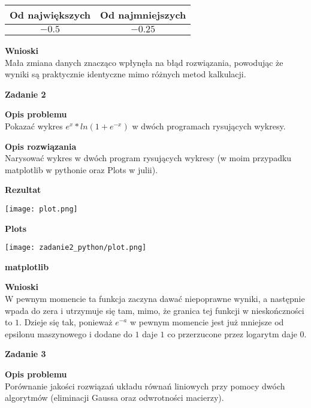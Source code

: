 \documentclass{article}
\begin{document}
\begin{center}
	\begin{tabular}{|c|c|}
		\hline
		\textbf{Od największych} & \textbf{Od najmniejszych} \\
		\hline
		$-0.5$                   & $-0.25$                   \\
		\hline
	\end{tabular}
\end{center}

\noindent \textbf{Wnioski} \\
Mała zmiana danych znacząco wpłynęła na błąd rozwiązania, powodując że wyniki
są praktycznie identyczne mimo różnych metod kalkulacji.

\noindent \textbf{\large Zadanie 2}

\noindent \textbf{Opis problemu} \\
Pokazać wykres $e^x*ln(1 + e^{-x})$ w dwóch programach rysujących wykresy.

\noindent \textbf{Opis rozwiązania} \\
Narysować wykres w dwóch program rysujących wykresy (w moim przypadku
matplotlib w pythonie oraz Plots w julii).

\pagebreak

\noindent \textbf{Rezultat}

\begin{center}
	\texttt{[image: plot.png]}

	\textbf{Plots}
\end{center}

\begin{center}
	\texttt{[image: zadanie2\_python/plot.png]}

	\textbf{matplotlib}
\end{center}

\noindent \textbf{Wnioski} \\
W pewnym momencie ta funkcja zaczyna dawać niepoprawne wyniki, a następnie
wpada do zera i utrzymuje się tam, mimo, że granica tej funkcji w nieskończności
to $1$. Dzieje się tak, ponieważ $e^{-a}$ w pewnym momencie jest już mniejsze od
epsilonu maszynowego i dodane do $1$ daje $1$ co przerzucone przez logarytm daje $0$.

\pagebreak

\noindent \textbf{\large Zadanie 3}

\noindent \textbf{Opis problemu} \\
Porównanie jakości rozwiązań układu równań liniowych przy pomocy dwóch algorytmów
(eliminacji Gaussa oraz odwrotności macierzy).
\end{document}
